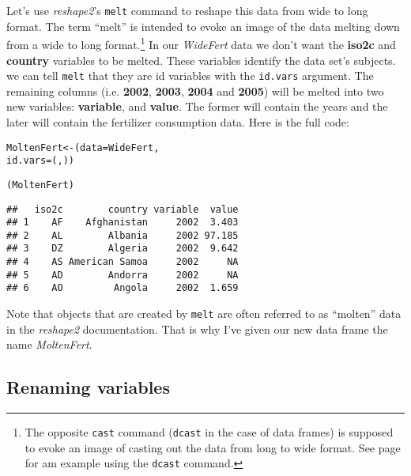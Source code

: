 Let's use \emph{reshape2}'s \texttt{melt} command to reshape this data from wide to long format. The term ``melt'' is intended to evoke an image of the data melting down from a wide to long format.\footnote{The opposite \texttt{cast} command (\texttt{dcast} in the case of data frames) is supposed to evoke an image of casting out the data from long to wide format. See page \pageref{WideAppendix} for am example using the \texttt{dcast} command.} In our \emph{WideFert} data we don't want the \textbf{iso2c} and \textbf{country} variables to be melted. These variables identify the data set's subjects. we can tell \texttt{melt} that they are id variables with the \texttt{id.vars} argument. The remaining columns (i.e. \textbf{2002}, \textbf{2003}, \textbf{2004} and \textbf{2005}) will be melted into two new variables: \textbf{variable}, and \textbf{value}. The former will contain the years and the later will contain the fertilizer consumption data. Here is the full code:

\begin{knitrout}
\color{fgcolor}\begin{kframe}
\begin{alltt}
MoltenFert <- (data = WideFert, 
                    id.vars = (, ))

(MoltenFert)
\end{alltt}
\begin{verbatim}
##   iso2c        country variable  value
## 1    AF    Afghanistan     2002  3.403
## 2    AL        Albania     2002 97.185
## 3    DZ        Algeria     2002  9.642
## 4    AS American Samoa     2002     NA
## 5    AD        Andorra     2002     NA
## 6    AO         Angola     2002  1.659
\end{verbatim}
\end{kframe}
\end{knitrout}


\noindent Note that objects that are created by \texttt{melt} are often referred to as ``molten'' data in the \emph{reshape2} documentation. That is why I've given our new data frame the name \emph{MoltenFert}. 

\subsection{Renaming variables}

